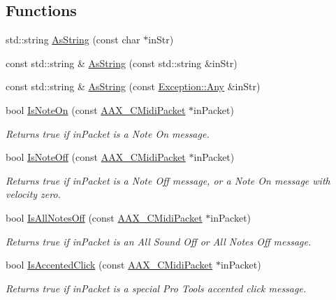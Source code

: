 \subsection*{Functions}
\begin{DoxyCompactItemize}
\item 
std\+::string \mbox{\hyperlink{a00852_a8fbde5607de487515bcb55631bc1377d}{As\+String}} (const char $\ast$in\+Str)
\item 
const std\+::string \& \mbox{\hyperlink{a00852_a1bdf9d0d3be5b5f11d47df256a2e9490}{As\+String}} (const std\+::string \&in\+Str)
\item 
const std\+::string \& \mbox{\hyperlink{a00852_a9d87a7ed401f9deb8386a14c7bd8aaae}{As\+String}} (const \mbox{\hyperlink{a01593}{Exception\+::\+Any}} \&in\+Str)
\item 
bool \mbox{\hyperlink{a00852_a1561efb3b1dbe3d13ef18f4b4d9dee40}{Is\+Note\+On}} (const \mbox{\hyperlink{a01429}{A\+A\+X\+\_\+\+C\+Midi\+Packet}} $\ast$in\+Packet)
\begin{DoxyCompactList}\small\item\em Returns true if {\ttfamily in\+Packet} is a Note On message. \end{DoxyCompactList}\item 
bool \mbox{\hyperlink{a00852_a91041690c271a718ef9451f66a7f6bb2}{Is\+Note\+Off}} (const \mbox{\hyperlink{a01429}{A\+A\+X\+\_\+\+C\+Midi\+Packet}} $\ast$in\+Packet)
\begin{DoxyCompactList}\small\item\em Returns true if {\ttfamily in\+Packet} is a Note Off message, or a Note On message with velocity zero. \end{DoxyCompactList}\item 
bool \mbox{\hyperlink{a00852_a509974acde19fde832cd5fdeb5eaabe2}{Is\+All\+Notes\+Off}} (const \mbox{\hyperlink{a01429}{A\+A\+X\+\_\+\+C\+Midi\+Packet}} $\ast$in\+Packet)
\begin{DoxyCompactList}\small\item\em Returns true if {\ttfamily in\+Packet} is an All Sound Off or All Notes Off message. \end{DoxyCompactList}\item 
bool \mbox{\hyperlink{a00852_afd05400c946e625772428cad4be7d552}{Is\+Accented\+Click}} (const \mbox{\hyperlink{a01429}{A\+A\+X\+\_\+\+C\+Midi\+Packet}} $\ast$in\+Packet)
\begin{DoxyCompactList}\small\item\em Returns true if {\ttfamily in\+Packet} is a special Pro Tools accented click message. \end{DoxyCompactList}\item 

\end{DoxyCompactItemize}
